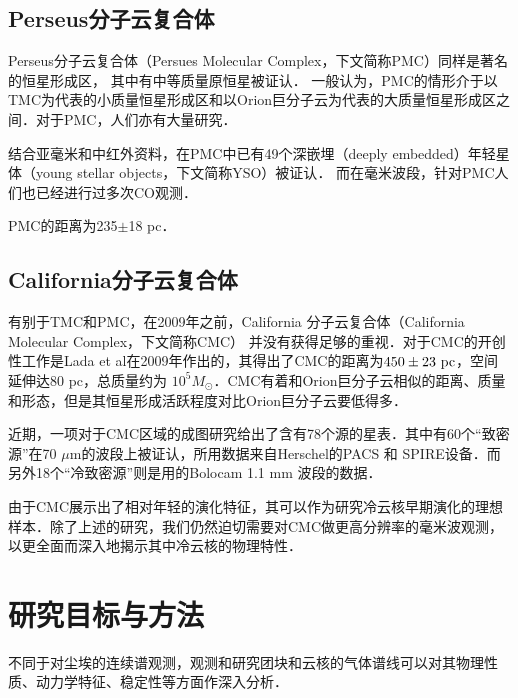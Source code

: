 \documentclass[UTF8, nocolorlinks]{pkuthss}
\begin{document}
		\subsection{Perseus分子云复合体}

			Perseus分子云复合体（Persues Molecular Complex，下文简称PMC）同样是著名的恒星形成区， 其中有中等质量原恒星被证认\supercite{2010A&A...512A..67L}． 一般认为，PMC的情形介于以TMC为代表的小质量恒星形成区和以Orion巨分子云为代表的大质量恒星形成区之间\supercite{2010ApJ...711..655J}．对于PMC，人们亦有大量研究．

			结合亚毫米和中红外资料，在PMC中已有49个深嵌埋（deeply embedded）年轻星体（young stellar objects，下文简称YSO）被证认\supercite{2007ApJ...656..293J}． 而在毫米波段，针对PMC人们也已经进行过多次CO观测\supercite{1979ApJ...233..163S,1999ApJ...525..318P, 2005A&A...440..151H}．

			PMC的距离为235$\pm$18 pc\supercite{2010A&A...512A..67L}．

		\subsection{California分子云复合体}

			有别于TMC和PMC，在2009年之前，California 分子云复合体（California Molecular Complex，下文简称CMC） 并没有获得足够的重视．对于CMC的开创性工作是Lada et al在2009年作出的，其得出了CMC的距离为$450\pm23\rm\ pc$，空间延伸达80 pc，总质量约为 $10^5 M_\odot$\supercite{2009ApJ...703...52L}．CMC有着和Orion巨分子云相似的距离、质量和形态，但是其恒星形成活跃程度对比Orion巨分子云要低得多\supercite{2009ApJ...703...52L,2010A&A...512A..67L}．

			近期，一项对于CMC区域的成图研究给出了含有78个源的星表\supercite{2013ApJ...764..133H}．其中有60个“致密源”在70 $\mu$m的波段上被证认，所用数据来自Herschel的PACS 和 SPIRE设备\supercite{2013ApJ...764..133H}．而另外18个“冷致密源”则是用的Bolocam 1.1 mm 波段的数据\supercite{2013ApJ...764..133H}．

			由于CMC展示出了相对年轻的演化特征，其可以作为研究冷云核早期演化的理想样本．除了上述的研究，我们仍然迫切需要对CMC做更高分辨率的毫米波观测，以更全面而深入地揭示其中冷云核的物理特性．

	\section{研究目标与方法}

		不同于对尘埃的连续谱观测，观测和研究团块和云核的气体谱线可以对其物理性质、动力学特征、稳定性等方面作深入分析．
\end{document}
